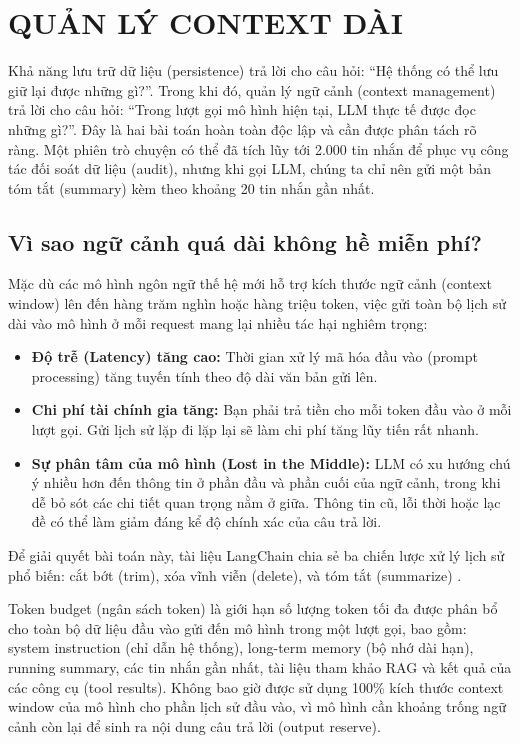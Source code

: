 \chapter{QUẢN LÝ CONTEXT DÀI}
\label{chap:long-context}

Khả năng lưu trữ dữ liệu (persistence) trả lời cho câu hỏi: ``Hệ thống có thể lưu giữ lại được những gì?''. Trong khi đó, quản lý ngữ cảnh (context management) trả lời cho câu hỏi: ``Trong lượt gọi mô hình hiện tại, LLM thực tế được đọc những gì?''. Đây là hai bài toán hoàn toàn độc lập và cần được phân tách rõ ràng. Một phiên trò chuyện có thể đã tích lũy tới 2.000 tin nhắn để phục vụ công tác đối soát dữ liệu (audit), nhưng khi gọi LLM, chúng ta chỉ nên gửi một bản tóm tắt (summary) kèm theo khoảng 20 tin nhắn gần nhất.

\section{Vì sao ngữ cảnh quá dài không hề miễn phí?}

Mặc dù các mô hình ngôn ngữ thế hệ mới hỗ trợ kích thước ngữ cảnh (context window) lên đến hàng trăm nghìn hoặc hàng triệu token, việc gửi toàn bộ lịch sử dài vào mô hình ở mỗi request mang lại nhiều tác hại nghiêm trọng:
\begin{itemize}
  \item \textbf{Độ trễ (Latency) tăng cao:} Thời gian xử lý mã hóa đầu vào (prompt processing) tăng tuyến tính theo độ dài văn bản gửi lên.
  \item \textbf{Chi phí tài chính gia tăng:} Bạn phải trả tiền cho mỗi token đầu vào ở mỗi lượt gọi. Gửi lịch sử lặp đi lặp lại sẽ làm chi phí tăng lũy tiến rất nhanh.
  \item \textbf{Sự phân tâm của mô hình (Lost in the Middle):} LLM có xu hướng chú ý nhiều hơn đến thông tin ở phần đầu và phần cuối của ngữ cảnh, trong khi dễ bỏ sót các chi tiết quan trọng nằm ở giữa. Thông tin cũ, lỗi thời hoặc lạc đề có thể làm giảm đáng kể độ chính xác của câu trả lời.
\end{itemize}

Để giải quyết bài toán này, tài liệu LangChain chia sẻ ba chiến lược xử lý lịch sử phổ biến: cắt bớt (trim), xóa vĩnh viễn (delete), và tóm tắt (summarize) \parencite{langchainShortTermMemory}.

\begin{aidefinition}
Token budget (ngân sách token) là giới hạn số lượng token tối đa được phân bổ cho toàn bộ dữ liệu đầu vào gửi đến mô hình trong một lượt gọi, bao gồm: system instruction (chỉ dẫn hệ thống), long-term memory (bộ nhớ dài hạn), running summary, các tin nhắn gần nhất, tài liệu tham khảo RAG và kết quả của các công cụ (tool results). Không bao giờ được sử dụng 100\% kích thước context window của mô hình cho phần lịch sử đầu vào, vì mô hình cần khoảng trống ngữ cảnh còn lại để sinh ra nội dung câu trả lời (output reserve).
\end{aidefinition}

